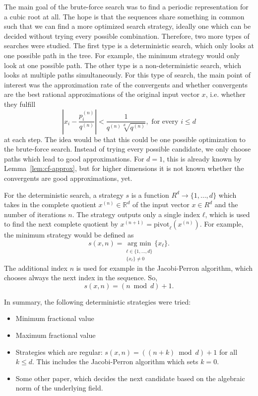The main goal of the brute-force search was to find a periodic representation for a cubic root at all.
The hope is that the sequences share something in common such that we can find
a more optimized search strategy, ideally one which can be decided without
trying every possible combination.
Therefore, two more types of searches were studied.
The first type is a deterministic search,
which only looks at one possible path in the tree.
For example, the minimum strategy would only look at one possible path.
The other type is a non-deterministic search,
which looks at multiple paths simultaneously.
For this type of search, the main point of interest was the approximation rate of the convergents
and whether convergents are the best rational approximations of the original input vector $x$,
i.e. whether they fulfill
\[
  |x_i - \frac{p_i^{(n)}}{q^{(n)}}| < \frac{1}{q^{(n)} \sqrt[d]{q^{(n)}}}, \text{ for every } i ≤ d
\]
at each step.
The idea would be that this could be one possible optimization to the brute-force search.
Instead of trying every possible candidate, we only choose paths which lead to good approximations.
For $d = 1$, this is already known by Lemma~\ref{lem:cf-approx},
but for higher dimensions it is not known whether the convergents are good
approximations, yet.

For the deterministic search, a strategy $s$ is a function $R^d → \{1, …, d\}$
which takes in the complete quotient $x^{(n)} ∈ ℝ^d$ of the input vector $x ∈ R^d$
and the number of iterations $n$.
The strategy outputs only a single index $ℓ$,
which is used to find the next complete quotient by $x^{(n+1)} =
\mathrm{pivot}_ℓ(x^{(n)})$.
For example, the minimum strategy would be defined as
\[
  s(x, n) = \underset{\substack{ℓ ∈ \{1, …, d\} \\ \{x_ℓ\} ≠ 0}}{\text{arg min}} \{x_ℓ\}.
\]
The additional index $n$ is used for example in the Jacobi-Perron algorithm,
which chooses always the next index in the sequence.
So,
\[
  s(x, n) = (n \bmod d) + 1.
\]

In summary, the following deterministic strategies were tried:
\begin{itemize}
  \item Minimum fractional value
  \item Maximum fractional value
  \item Strategies which are regular: $s(x, n) = ((n + k) \bmod d) + 1$ for all $k ≤ d$.
    This includes the Jacobi-Perron algorithm which sets $k = 0$.
  \item Some other paper, which decides the next candidate
    based on the algebraic norm of the underlying field. %
\end{itemize}

